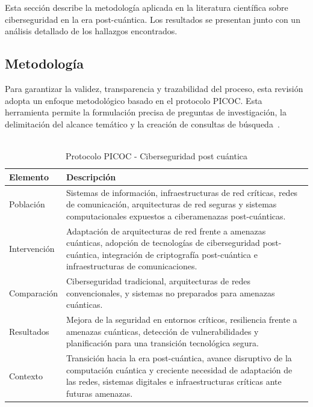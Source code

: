 \chapter{\cybersecurityname}
\label{slr_ciber}
Esta sección describe la metodología aplicada en la literatura científica sobre ciberseguridad en la era post-cuántica. Los resultados se presentan junto con un análisis detallado de los hallazgos encontrados.

\section {Metodología}
\label{metodologia}

Para garantizar la validez, transparencia y trazabilidad del proceso, esta revisión adopta un enfoque metodológico basado en el protocolo PICOC. Esta herramienta permite la formulación precisa de preguntas de investigación, la delimitación del alcance temático y la creación de consultas de búsqueda~\cite{CarreraRivera2022}.

\begin{table}[H]
\centering
\caption[Protocolo PICOC - Ciberseguridad post cuántica]{%
    \vspace{4pt}
    \fontsize{12}{11}\selectfont \\
    Protocolo PICOC - Ciberseguridad post cuántica \\[2pt] %
}
\label{tab:protocolo_picoc}
\begin{tabular}{@{} l p{10cm} @{}} %
\hline\hline
\textbf{Elemento} & \textbf{Descripción} \\
\hline
Población & Sistemas de información, infraestructuras de red críticas, redes de comunicación, arquitecturas de red seguras y sistemas computacionales expuestos a ciberamenazas post-cuánticas. \\
\hline
Intervención & Adaptación de arquitecturas de red frente a amenazas cuánticas, adopción de tecnologías de ciberseguridad post-cuántica, integración de criptografía post-cuántica e infraestructuras de comunicaciones. \\
\hline
Comparación & Ciberseguridad tradicional, arquitecturas de redes convencionales, y sistemas no preparados para amenazas cuánticas. \\
\hline
Resultados & Mejora de la seguridad en entornos críticos, resiliencia frente a amenazas cuánticas, detección de vulnerabilidades y planificación para una transición tecnológica segura. \\
\hline
Contexto & Transición hacia la era post-cuántica, avance disruptivo de la computación cuántica y creciente necesidad de adaptación de las redes, sistemas digitales e infraestructuras críticas ante futuras amenazas. \\
\hline\hline
\end{tabular}
\end{table}

